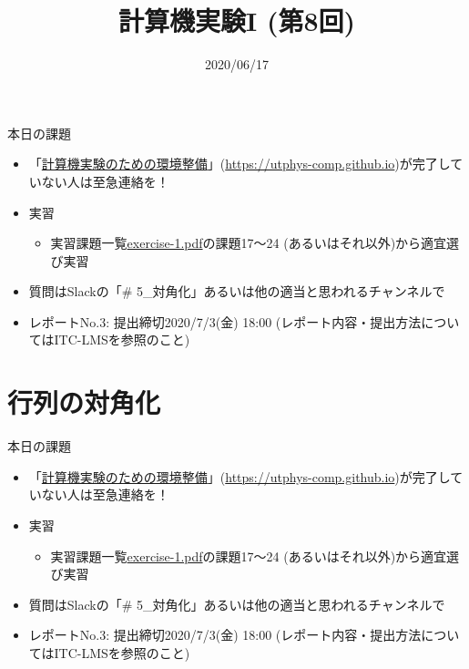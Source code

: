 \documentclass[10pt,dvipdfmx]{beamer}
\title{計算機実験I (第8回)}
\date{2020/06/17}
\begin{document}
\begin{frame}
  \titlepage
  \tableofcontents
\end{frame}

\begin{frame}[t]{本日の課題}
  \begin{itemize}
  \item 「\href{https://utphys-comp.github.io}{計算機実験のための環境整備}」({\small \href{https://utphys-comp.github.io}{https://utphys-comp.github.io}})が完了していない人は至急連絡を！
  \item 実習
    \begin{itemize}
    \item 実習課題一覧\href{https://github.com/todo-group/ComputerExperiments/releases/tag/2020s-computer1}{exercise-1.pdf}の課題17〜24 (あるいはそれ以外)から適宜選び実習
    \end{itemize}
  \item 質問はSlackの「\# 5\_対角化」あるいは他の適当と思われるチャンネルで
  \item レポートNo.3: 提出締切2020/7/3(金) 18:00 (レポート内容・提出方法についてはITC-LMSを参照のこと)
  \end{itemize}
\end{frame}

\section{行列の対角化}





%
%

\begin{frame}[t]{本日の課題}
  \begin{itemize}
  \item 「\href{https://utphys-comp.github.io}{計算機実験のための環境整備}」({\small \href{https://utphys-comp.github.io}{https://utphys-comp.github.io}})が完了していない人は至急連絡を！
  \item 実習
    \begin{itemize}
    \item 実習課題一覧\href{https://github.com/todo-group/ComputerExperiments/releases/tag/2020s-computer1}{exercise-1.pdf}の課題17〜24 (あるいはそれ以外)から適宜選び実習
    \end{itemize}
  \item 質問はSlackの「\# 5\_対角化」あるいは他の適当と思われるチャンネルで
  \item レポートNo.3: 提出締切2020/7/3(金) 18:00 (レポート内容・提出方法についてはITC-LMSを参照のこと)
  \end{itemize}
\end{frame}
\end{document}
